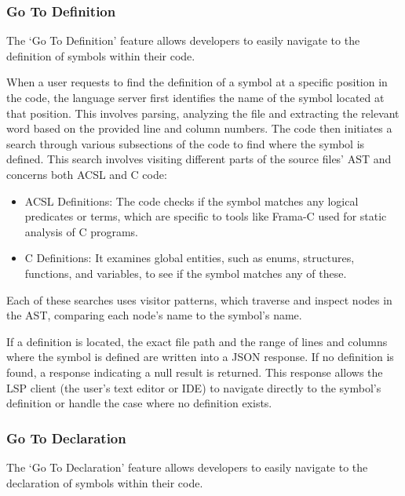 \documentclass[10pt]{article}
\begin{document}
\begin{singlespace}
\subsubsection{Go To Definition}
The `Go To Definition' feature allows developers to easily navigate to the definition of symbols within their code. 

When a user requests to find the definition of a symbol at a specific position in the code, the language server first identifies the name of the symbol located at that position. This involves parsing, analyzing the file and extracting the relevant word based on the provided line and column numbers.
The code then initiates a search through various subsections of the code to find where the symbol is defined. This search involves visiting different parts of the source files' AST and concerns both ACSL and C code:
\begin{itemize}
\item[--] ACSL Definitions: The code checks if the symbol matches any logical predicates or terms, which are specific to tools like Frama-C used for static analysis of C programs.
\item[--] C Definitions: It examines global entities, such as enums, structures, functions, and variables, to see if the symbol matches any of these.
\end{itemize}
Each of these searches uses visitor patterns, which traverse and inspect nodes in the AST, comparing each node's name to the symbol's name.

If a definition is located, the exact file path and the range of lines and columns where the symbol is defined are written into a JSON response. If no definition is found, a response indicating a null result is returned. This response allows the LSP client (the user's text editor or IDE) to navigate directly to the symbol's definition or handle the case where no definition exists.

\subsubsection{Go To Declaration}
The `Go To Declaration' feature allows developers to easily navigate to the declaration of symbols within their code. 


\end{singlespace}
\end{document}

